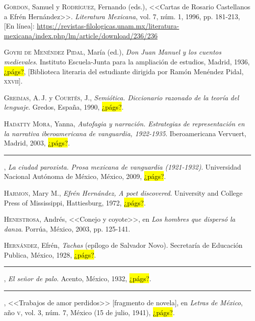 \documentclass[14pt,twoside,final]{extbook} %
\begin{document}
\textsc{Gordon}, Samuel y \textsc{Rodríguez}, Fernando (eds.), <<Cartas de Rosario Castellanos a Efrén Hernández>>. \emph{Literatura Mexicana}, vol. 7, núm. 1, 1996, pp. 181-213, [En línea]: \href{https://revistas-filologicas.unam.mx/literatura-mexicana/index.php/lm/article/download/236/236}{https://revistas-filologicas.unam.mx/literatura-mexicana/index.php/lm/article/download/236/236}\label{bib:gordon-rodriguez1996} 

\textsc{Goyri de Menéndez Pidal}, María (ed.), \emph{Don Juan Manuel y los cuentos medievales}. Instituto Escuela-Junta para la ampliación de estudios, Madrid, 1936, \hl{¿págs?}, [Biblioteca literaria del estudiante dirigida por Ramón Menéndez Pidal, \textsc{xxvii}].\label{bib:goyri1936}

\textsc{Greimas}, A.\,J. y \textsc{Courtés}, J., \emph{Semiótica. Diccionario razonado de la teoría del lenguaje}. Gredos, España, 1990, \hl{¿págs?}.\label{bib:greimas1990}

\textsc{Hadatty Mora}, Yanna, \emph{Autofagia y narración. Estrategias de representación en la narrativa iberoamericana de vanguardia, 1922-1935}. Iberoamericana Vervuert, Madrid, 2003, \hl{¿págs?}.\label{bib:hadatty2003}

\rule{1cm}{0.4pt}, \emph{La ciudad paroxista. Prosa mexicana de vanguardia (1921-1932)}. Universidad Nacional Autónoma de México, México, 2009, \hl{¿págs?}.\label{bib:hadatty2009}

\textsc{Harmon}, Mary M., \emph{Efrén Hernández, A poet discovered}. University and College Press of Mississippi, Hattiesburg, 1972, \hl{¿págs?}.\label{bib:harmon1972}

\textsc{Henestrosa}, Andrés, <<Conejo y coyote>>, en \emph{Los hombres que dispersó la danza}. Porrúa, México, 2003, pp. 125-141.\label{bib:henestroza2003}

\textsc{Hernández}, Efrén, \emph{Tachas} (epílogo de Salvador Novo). Secretaría de Educación Publica, México, 1928, \hl{¿págs?}.\label{bib:hernandez1928}

\rule{1cm}{0.4pt}, \emph{El señor de palo}. Acento, México, 1932, \hl{¿págs?}.\label{bib:hernandez1932}

\rule{1cm}{0.4pt}, <<Trabajos de amor perdidos>> [fragmento de novela], en \emph{Letras de México}, año \textsc{v}, vol. 3, núm. 7, México (15 de julio, 1941), \hl{¿págs?}.\label{bib:hernandez1941}
\end{document}
